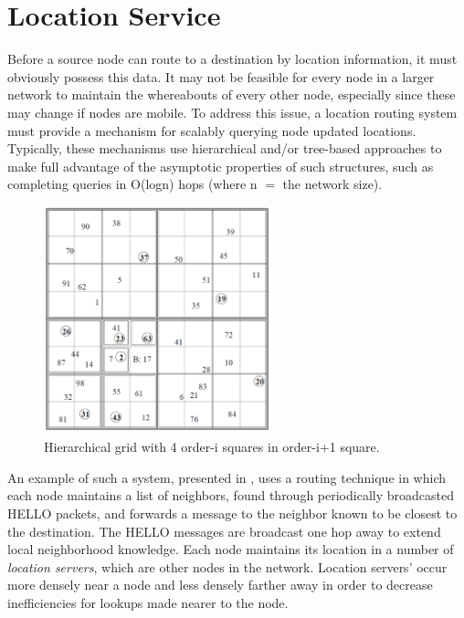 \documentclass[conference]{IEEEtran}
\newcommand{\colwidth}{2.6in}
\begin{document}
\section{Location Service}

Before a source node can route to a destination by location information, it must obviously possess this data.
It may not be feasible for every node in a larger network to maintain the whereabouts of every other node, especially since these may change if nodes are mobile.
To address this issue, a location routing system must provide a mechanism for scalably querying node updated locations.
Typically, these mechanisms use hierarchical and/or tree-based approaches to make full advantage of the asymptotic properties of such structures, such as completing queries in O(logn) hops (where n $=$ the network size).

\begin{figure}
\label{fig:location-service}
\centering
\includegraphics[width=\colwidth]{../../images/external/location_routing/location_service.pdf}
\caption{Hierarchical grid with 4 order-i squares in order-i+1 square.}
\end{figure}

An example of such a system, presented in \cite{Li:2000:SLS:345910.345931}, uses a routing technique in which each node maintains a list of neighbors, found through periodically broadcasted HELLO packets, and forwards a message to the neighbor known to be closest to the destination.
The HELLO messages are broadcast one hop away to extend local neighborhood knowledge.
Each node maintains its location in a number of \emph{location servers}, which are other nodes in the network.
Location servers' occur more densely near a node and less densely farther away in order to decrease inefficiencies for lookups made nearer to the node.
\end{document}
